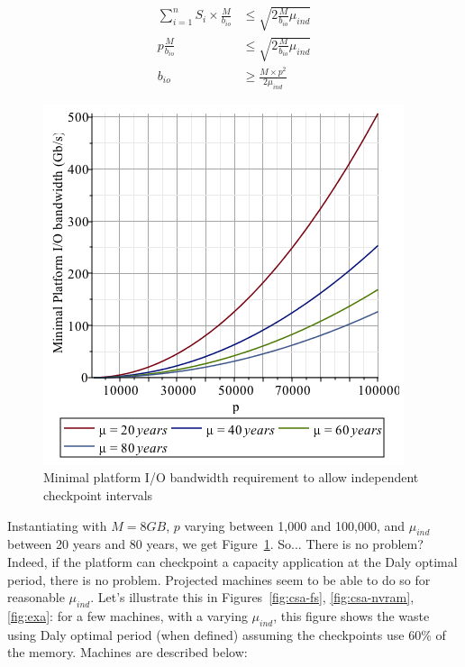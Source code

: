 \documentclass{article}
\begin{document}
$$\begin{array}{rl}
\sum_{i = 1}^{n} S_i\times \frac{M}{b_{io}} & \leq \sqrt{2\frac{M}{b_{io}}\mu_{ind}}\\
p\frac{M}{b_{io}} & \leq \sqrt{2\frac{M}{b_{io}}\mu_{ind}}\\
b_{io} & \geq \frac{M\times p^2}{2\mu_{ind}}
\end{array}$$

\begin{figure}[h!]
  \begin{center}
    \includegraphics[width=.6\linewidth]{biomin.png}
  \end{center}
  \caption{Minimal platform I/O bandwidth requirement to allow independent checkpoint intervals\label{fig:minio}}
\end{figure}
 
Instantiating with $M = 8GB$, $p$ varying between 1,000 and 100,000, and $\mu_{ind}$ between 20 years and 80 years, we get Figure~\ref{fig:minio}. So... There is no problem? Indeed, if the platform can checkpoint a capacity application at the Daly optimal period, there is no problem. Projected machines seem to be able to do so for reasonable $\mu_{ind}$. Let's illustrate this in Figures~\ref{fig:csa-fs}, \ref{fig:csa-nvram}, \ref{fig:exa}: for a few machines, with a varying $\mu_{ind}$, this figure shows the waste using Daly optimal period (when defined) assuming the checkpoints use 60\% of the memory. Machines are described below:
\end{document}
